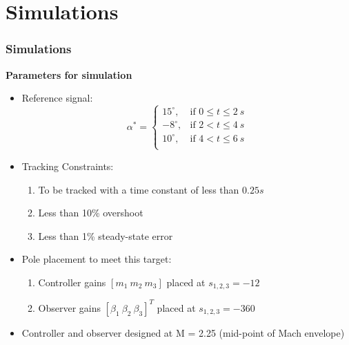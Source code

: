 \documentclass[table,10pt,red]{beamer}	%
\begin{document}
\section{Simulations}
\begin{frame}
\frametitle{Simulations}
\textbf{Parameters for simulation}
\begin{itemize}  %
		\item Reference signal: \\  
		\begin{equation}
			\alpha^{*}=
			\begin{cases}
			15^{\circ}, & \text{if $0 \leq t \leq2 ~ s$}\\
			-8^{\circ}, & \text{if $2 < t \leq4 ~ s$}\\
			10^{\circ}, & \text{if $4 < t \leq6 ~ s$} \label{ref_sig}\\ 
			\end{cases} \nonumber
		\end{equation}
		\item Tracking Constraints:
		\begin{enumerate}
			\item To be tracked with a time constant of less than $0.25s$
			\item Less than 10\% overshoot
			\item Less than 1\% steady-state error
		\end{enumerate}
		\item Pole placement to meet this target:
		\begin{enumerate}
			\item Controller gains $[m_1\ m_2 \ m_3]$ placed at $s_{1,2,3} = -12$
			\item Observer gains $[\beta_1 \ \beta_2 \ \beta_3]^T$ placed at $s_{1,2,3} = -360$
		\end{enumerate}
	
		\item Controller and observer designed at M = 2.25 (mid-point of Mach envelope)
	\end{itemize}

\end{frame}

\end{document}
